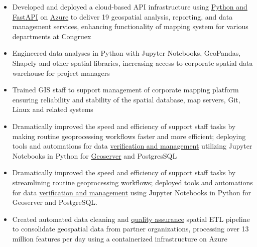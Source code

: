 \documentclass[letterpaper]{article}
\newenvironment{jobtasklist}
        {
            \vspace{-12pt}
            \begin{itemize} \itemsep 0pt
        }{
            \end{itemize}
            \vspace{-3pt}
        }
\newcommand{\impt}[1]{\uline{#1}}
\begin{document}
\begin{jobtasklist}
    \item Developed and deployed a cloud-based API infrastructure using 
        \impt{Python and FastAPI} on 
        \impt{Azure} to deliver 19 geospatial analysis, reporting, and data management
        services, enhancing functionality of mapping system for various departments at
        Congruex

    \item Engineered data analyses in Python with Jupyter Notebooks, GeoPandas, Shapely
            and other spatial libraries,
            increasing access to corporate spatial data warehouse for project managers

    \item Trained GIS staff to support management of corporate mapping platform ensuring reliability 
            and stability of the
            spatial database, map servers, Git, Linux and related systems


    \item Dramatically improved the speed and efficiency of support staff tasks
            by making routine geoprocessing workflows faster and more efficient;
            deploying tools and automations for data \impt{verification and management}
            utilizing Jupyter Notebooks in Python for \impt{Geoserver}
            and PostgresSQL
    \item Dramatically improved the speed and efficiency of support staff tasks 
            by streamlining routine geoprocessing workflows; 
            deployed tools and automations for data \impt{verification and management} using 
            Jupyter Notebooks in Python for Geoserver and PostgreSQL.
%
%
        \item Created automated data cleaning and \impt{quality assurance} spatial ETL pipeline
            to consolidate geospatial data
            from partner organizations, processing over 13 million features per day
            using a containerized infrastructure on Azure

\end{jobtasklist}
\end{document}

